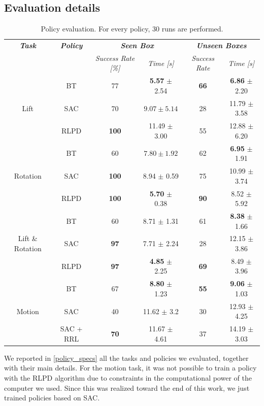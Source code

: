 \documentclass[letterpaper, 10 pt, conference]{ieeeconf}  %
\begin{document}
\subsection{Evaluation details}\label{eval_details}

\begin{table}[t]
    \centering
    \caption{Policy evaluation. For every policy, 30 runs are performed.}
    \renewcommand{\arraystretch}{1.5}
    \begin{tabular}{c|c|cc|cc}
        \toprule \textit{\textbf{Task}} & \textit{\textbf{Policy}} & \multicolumn{2}{c|}{\textit{\textbf{Seen Box}}} & \multicolumn{2}{c}{\textit{\textbf{Unseen Boxes}}} \\
         & & \textit{Success Rate [\%]} & \textit{Time [s]} & \textit{Success Rate} & \textit{Time [s]} \\
        \midrule  & BT & 77 & \textbf{5.57} $\pm$ 2.54 & \textbf{66} & \textbf{6.86} $\pm$ 2.20 \\
         Lift & SAC & 70 & $9.07\pm5.14$ & 28 & 11.79 $\pm$ 3.58 \\
         & RLPD & \textbf{100} & 11.49 $\pm$ 3.00 & 55 & 12.88 $\pm$ 6.20 \\
        \midrule & BT & 60 & $7.80\pm1.92$ & 62 & \textbf{6.95} $\pm$ 1.91 \\
        Rotation & SAC & \textbf{100} & 8.94 $\pm$ 0.59 & 75 & 10.99 $\pm$ 3.74 \\
         & RLPD & \textbf{100} & \textbf{5.70} $\pm$ 0.38 & \textbf{90} & 8.52 $\pm$ 5.92 \\
        \midrule & BT & 60 & 8.71 $\pm$ 1.31 & 61 & \textbf{8.38} $\pm$ 1.66 \\
        Lift \& Rotation & SAC & \textbf{97} & 7.71 $\pm$ 2.24 & 28 & 12.15 $\pm$ 3.86 \\
         & RLPD & \textbf{97} & \textbf{4.85} $\pm$ 2.25 & \textbf{69} & 8.49 $\pm$ 3.96 \\
        \midrule & BT & 67 & \textbf{8.80} $\pm$ 1.23 & \textbf{55} & \textbf{9.06} $\pm$ 1.03 \\
        Motion & SAC & 40 & 11.62 $\pm$ 3.2 & 30 & 12.93 $\pm$ 4.25 \\
         & SAC + RRL & \textbf{70} & 11.67 $\pm$ 4.61 & 37 & 14.19 $\pm$ 3.03 \\
        \bottomrule
    \end{tabular}
    \label{results}
\end{table}

We reported in \cref{policy_specs} all the tasks and policies we evaluated, together with their main details. For the motion task, it was not possible to train a policy with the RLPD algorithm due to constraints in the computational power of the computer we used. Since this was realized toward the end of this work, we just trained policies based on SAC.
\end{document}
